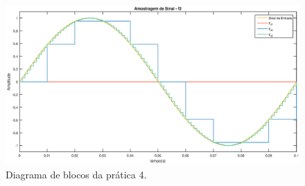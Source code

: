 	\begin{figure}[!th]
		\centering
		\includegraphics[scale = .45]{Imagens/pratica4_6.eps}
		\caption{Diagrama de blocos da prática 4.}
		\label{fig:pr4_esquema}
		\end{figure}